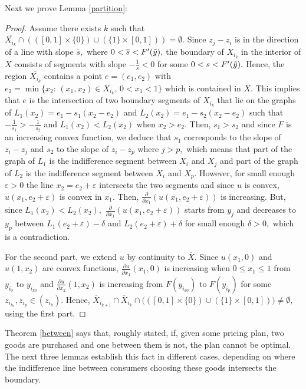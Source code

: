 \documentclass[12pt,reqno]{amsart}
\begin{document}
Next we prove Lemma \ref{partition}:
\begin{proof}
    Assume there exists $k$ such that $\overline{X_{i_k}}\cap (([0,1]\times\{0\}) \cup(\{1\}\times[0,1]))=\emptyset.$ Since $z_j-z_i$ is in the direction of a line with slope $\overline{s},$ where  $0<\overline{s}<F'(\Tilde{y}),$   the boundary of $X_{i_k}$ in the interior of $X$ consists of segments with slope $-\frac{1}{s}< 0$ for some $0<s<F'(\Tilde{y}).$ Hence, the region $\overline{X_{i_k}}$ contains a point $e=(e_1,e_2)$ with $e_2=\min\{x_2:\, (x_1,x_2)\in \overline{X_{i_k}},\,  0<x_1<1 \}$ which is contained in $\overline{X}.$ This implies that $e$ is the intersection  of two boundary segments of $X_{i_k}$ that lie on  the graphs of $L_1(x_2)=e_1-s_1(x_2-e_2)$ and $L_2(x_2)=e_1-s_2(x_2-e_2)$ such that  $-\frac{1}{s_1}>-\frac{1}{s_2}$ and  $L_1(x_2)<L_2(x_2)$ when $x_2>e_2.$  
   Then, $s_1>s_2$  and since $F$ is an increasing convex function, we deduce that $s_1$ corresponds to the slope of $z_i-z_j$ and  $s_2$ to the slope of $z_i-z_p$ where $j>p,$ which means that part of the graph of $L_1$ is the indifference segment between $X_i$ and $X_j$ and part of the graph of $L_2$ is the indifference segment between $X_i$ and $X_p.$ However, for small enough $\varepsilon>0$ the line $x_2=e_2+\varepsilon$ intersects the two segments and since $u$ is convex, $u(x_1,e_2+\varepsilon)$  is convex in $x_1$. Then,  $\frac{\partial}{\partial x_1}(u(x_1,e_2+\varepsilon))$  is increasing. But, since $L_1(x_2)<L_2(x_2),$ $\frac{\partial}{\partial x_1}(u(x_1,e_2+\varepsilon))$ starts from $y_j$ and decreases to $y_p$ between $L_1(e_2+\varepsilon)-\delta$ and $L_2(e_2+\varepsilon)+\delta$ for small enough $\delta>0,$  which is a contradiction.

For the second part, we extend $u$ by continuity to $\overline{X}.$ Since $u(x_1,0)$ and $u(1,x_2)$ are convex functions, $\frac{\partial u}{\partial x_1}(x_1,0)$ is increasing when $0\le x_1\le1$ from $y_{i_0}$ to $y_{i_{k0}}$ and $\frac{\partial u}{\partial x_2}(1,x_2)$ is increasing from $F(y_{i_{k0}})$ to  $F(y_{i_p})$ for some $z_{i_{k_0}},z_{i_{p}}\in (z_{i_{k}}).$ Hence, $\overline{X}_{i_{k+1}}\cap\overline{X}_{i_k}\cap \Big(([0,1]\times\{0\}) \cup(\{1\}\times[0,1])\Big)\neq \emptyset,$ using the first part. 
\end{proof}
Theorem \ref{between} says that, roughly stated, if, given some pricing plan,  two goods are purchased and one between them is not, the plan cannot be optimal.  The next three lemmas establish this fact in different cases, depending on where the indifference line between consumers choosing these goods intersects the boundary.
\end{document}
